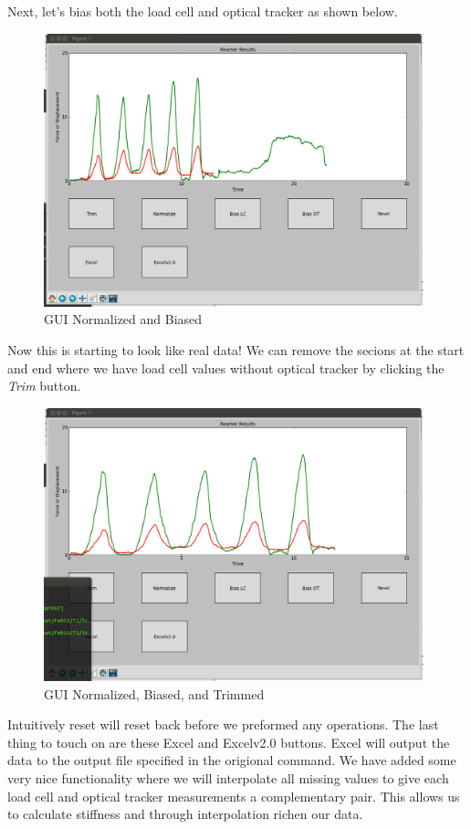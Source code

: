 \documentclass[pdftex,11pt,letterpaper]{article}
\begin{document}
\pagebreak
Next, let's bias both the load cell and optical tracker as shown below. \\

\begin{figure}[ht!]
\centering
\includegraphics[width=110mm]{./images/gui3}
\caption{GUI Normalized and Biased}
\end{figure}

Now this is starting to look like real data! We can remove the secions at the start and end where we have load cell values without optical tracker by clicking the \textit{Trim} button. \\

\begin{figure}[ht!]
\centering
\includegraphics[width=110mm]{./images/gui4}
\caption{GUI Normalized, Biased, and Trimmed}
\end{figure}

Intuitively reset will reset back before we preformed any operations. The last thing to touch on are these Excel and Excelv2.0 buttons. Excel will output the data to the output file specified in the origional command. We have added some very nice functionality where we will interpolate all missing values to give each load cell and optical tracker measurements a complementary pair. This allows us to calculate stiffness and through interpolation richen our data. \\
\end{document}
